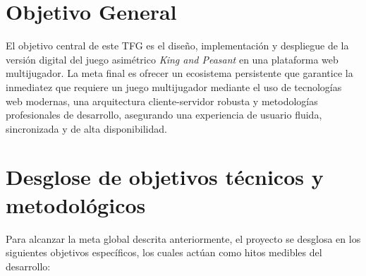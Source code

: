 \section{Objetivo General}

El objetivo central de este TFG es el diseño, implementación y despliegue de la versión digital del juego asimétrico \textit{King and Peasant} en una plataforma web multijugador. La meta final es ofrecer un ecosistema persistente que garantice la inmediatez que requiere un juego multijugador mediante el uso de tecnologías web modernas, una arquitectura cliente-servidor robusta y metodologías profesionales de desarrollo, asegurando una experiencia de usuario fluida, sincronizada y de alta disponibilidad.

\section{Desglose de objetivos técnicos y metodológicos}

Para alcanzar la meta global descrita anteriormente, el proyecto se desglosa en los siguientes objetivos específicos, los cuales actúan como hitos medibles del desarrollo:

